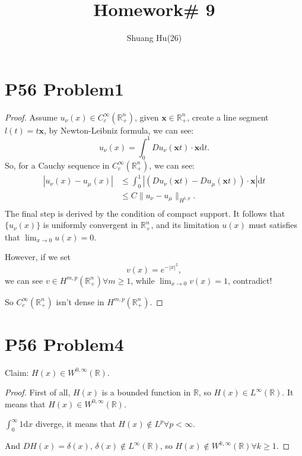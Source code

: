 \documentclass[a4paper]{ctexart}
\title{Homework\# 9}
\author{Shuang Hu(26)}
\newcommand{\dif}{\mathrm{d}}
\begin{document}
\maketitle
\section*{P56 Problem1}
\begin{proof}
    Assume $u_{\nu}(x)\in C_{c}^{\infty}(\mathbb{R}_{+}^{n})$, given $\mathbf{x}\in\mathbb{R}_{+}^{n}$, create a line segment $l(t)=t\mathbf{x}$, by Newton-Leibniz formula, we can see:
    \begin{equation}
        \label{eq:N-L}
        u_{\nu}(x)=\int_{0}^{1}Du_{\nu}(\mathbf{x}t)\cdot\mathbf{x}\dif t.
    \end{equation}
    So, for a Cauchy sequence in $C_{c}^{\infty}(\mathbb{R}_{+}^{n})$, we can see:
    \begin{equation}
        \label{eq:Cauchy}
        \begin{aligned}
        |u_{\nu}(x)-u_{\mu}(x)|&\le\int_{0}^{1}|(Du_{\nu}(\mathbf{x}t)-Du_{\mu}(\mathbf{x}t))\cdot\mathbf{x}|\dif t\\
        &\le C\|u_{\nu}-u_{\mu}\|_{H^{1,p}}.\\
        \end{aligned}
    \end{equation}
    The final step is derived by the condition of compact support. It follows that $\{u_{\nu}(x)\}$ is uniformly convergent in $\mathbb{R}_{+}^{n}$, and its limitation $u(x)$ must satisfies that $\lim_{x\rightarrow 0}u(x)=0$. 

    However, if we set 
    \begin{equation}
        v(x)=e^{-|x|^{2}},
    \end{equation}
    we can see $v\in H^{m,p}(\mathbb{R}_{+}^{n})\forall m\ge 1$, while $\lim_{x\rightarrow 0}v(x)=1$, contradict!
    
    So $C_{c}^{\infty}(\mathbb{R}_{+}^{n})$ isn't dense in $H^{m,p}(\mathbb{R}_{+}^{n})$.
\end{proof}
\section*{P56 Problem4}
Claim: $H(x)\in W^{0,\infty}(\mathbb{R})$.

\begin{proof}
    First of all, $H(x)$ is a bounded function in $\mathbb{R}$, so $H(x)\in L^{\infty}(\mathbb{R})$. It means that $H(x)\in W^{0,\infty}(\mathbb{R})$.

    $\int_{0}^{\infty}1\dif x$ diverge, it means that $H(x)\notin L^{p}\forall p<\infty$.

    And $DH(x)=\delta(x)$, $\delta(x)\notin L^{\infty}(\mathbb{R})$, so $H(x)\notin W^{k,\infty}(\mathbb{R})\forall k\ge 1$.
\end{proof}
\end{document}
